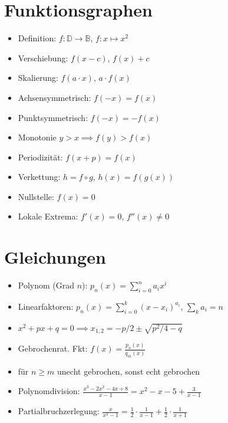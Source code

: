 \documentclass[a4paper,10pt]{article}
\begin{document}
\begin{multicols}{2}
\section {Funktionsgraphen}
\begin{itemize}
\item Definition: $f: \mathbb{D}  \to \mathbb{B}$, $f: x \mapsto x^2$
\item Verschiebung: $f(x-c)$, $f(x)+c$
\item Skalierung: $f(a\cdot x)$, $a\cdot f(x)$
\item Achsensymmetrisch: $f(-x) = f(x)$
\item Punktsymmetrisch: $f(-x) = -f(x)$
\item Monotonie $y > x \implies f(y) > f(x)$
\item Periodizität: $f(x+p) = f(x)$
\item Verkettung: $h = f \circ g$, $h(x) = f(g(x))$
\item Nullstelle: $f(x) = 0$
\item Lokale Extrema: $f'(x) = 0$, $f''(x) \ne 0$
\end{itemize}

\section {Gleichungen}
\begin{itemize}
\item Polynom (Grad $n$): $p_n(x)=\sum_{i=0}^n a_i x^i$
\item Linearfaktoren: $p_n(x) = \sum_{i=0}^k (x-x_i)^{a_i}$, $\sum_k a_i = n$
\item $x^2+px+q=0 \implies x_{1,2} = -p/2 \pm \sqrt{p^2/4-q}$
\item Gebrochenrat. Fkt: $f(x) = \frac{p_n(x)}{q_m(x)}$
\item für $n\ge m$ unecht gebrochen, sonst echt gebrochen
\item Polynomdivision: $\frac{x^3-2x^2-4x+8}{x-1} = x^2-x-5 + \frac{3}{x-1}$
\item Partialbruchzerlegung: $\frac{x}{x^2-1} = \frac{1}{2}\cdot\frac{1}{x-1} + \frac{1}{2}\cdot\frac{1}{x+1}$
\end{itemize}


\end{multicols}
\end{document}
